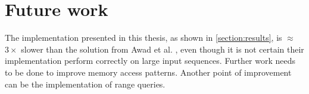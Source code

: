 \section{Future work}

The implementation presented in this thesis, as shown in \cref{section:results}, is $\approx$\,$3\times$ slower than the solution from Awad et al. \cite{awad}, even though it is not certain their implementation perform correctly on large input sequences. Further work needs to be done to improve memory access patterns. Another point of improvement can be the implementation of range queries.